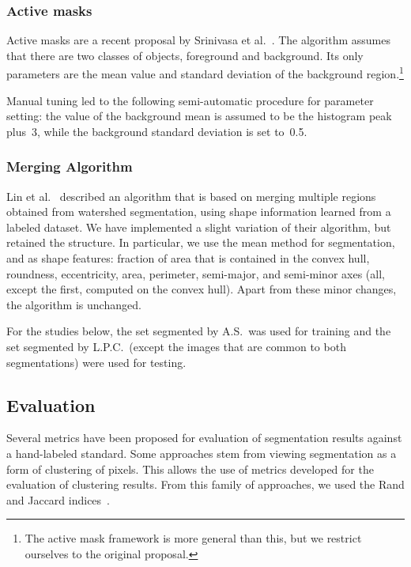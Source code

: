 \documentclass{article}
\begin{document}
\subsubsection{Active masks}

Active masks are a recent proposal by Srinivasa et al.~\cite{DBLP:conf/isbi/SrinivasaFGHGLK08}. The algorithm assumes that there are two classes of objects, foreground and background. Its only parameters are the mean value and standard deviation of the background region.\footnote{The active mask framework is more general than this, but we restrict ourselves to the original proposal.}

Manual tuning led to the following semi-automatic procedure for parameter setting: the value of the background mean is assumed to be the histogram peak plus~3, while the background standard deviation is set to~0.5.

\subsubsection{Merging Algorithm}

Lin et al.~\cite{LinRoysam} described an algorithm that is based on merging multiple regions obtained from watershed segmentation, using shape information learned from a labeled dataset. We have implemented a slight variation of their algorithm, but retained the structure. In particular, we use the mean method for segmentation, and as shape features: fraction of area that is contained in the convex hull, roundness, eccentricity, area, perimeter, semi-major, and semi-minor axes (all, except the first, computed on the convex hull). Apart from these minor changes, the algorithm is unchanged.

For the studies below, the set segmented by A.S.\ was used for training and the set segmented by L.P.C.\ (except the images that are common to both segmentations) were used for testing.

\subsection{Evaluation}

Several metrics have been proposed for evaluation of segmentation results against a hand-labeled standard. Some approaches stem from viewing segmentation as a form of clustering of pixels. This allows the use of metrics developed for the evaluation of clustering results. From this family of approaches, we used the Rand and Jaccard indices~\cite{RandDec1971,Saporta02comparingtwo}.
\end{document}
